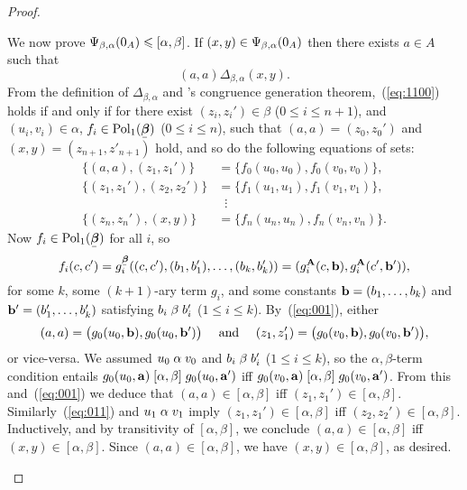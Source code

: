 \begin{proof}
\begin{enumerate}[(i)]
  We now prove $\Psi_{\beta, \alpha}(0_A)\leqslant   [\alpha, \beta]$.
  If $(x,y)\in \Psi_{\beta, \alpha}(0_A)$ then there exists $a \in A$ such that 
  \begin{equation}
    \label{eq:1100}
    (a,a) \mathrel{\Delta_{\beta, \alpha}} (x,y).
  \end{equation}
  From the definition of $\Delta_{\beta, \alpha}$ and 
  \malcev's congruence generation theorem,~(\ref{eq:1100})
  holds if and only if for there exist
  $(z_i, z_i') \in \beta$ ($0\leq i \leq n+1$), and $(u_i, v_i) \in \alpha$,
  $f_i \in \Pol_1(\bbeta)$ ($0\leq i \leq n$), such that
  $(a, a) = (z_0,z_0')$ and $(x, y)=(z_{n+1},z'_{n+1})$ hold, and so do the
  following equations of sets: 
  \begin{align}
    \label{eq:001}
    \{(a, a),(z_1,z_1')\} &= \{f_0(u_0,u_0), f_0(v_0,v_0)\},\\
    \label{eq:011}
    \{(z_1,z_1'),(z_2,z_2')\} &= \{f_1(u_1,u_1), f_1(v_1,v_1)\},\\
    \nonumber
    &\; \; \vdots\\
    \nonumber
    \{(z_{n},z_{n}'),(x, y)\} &= \{f_{n}(u_{n},u_{n}), f_{n}(v_{n},v_{n})\}.
  \end{align}
  Now $f_i \in \Pol_1(\bbeta)$ for all $i$, so
  \newcommand\gA{\ensuremath{g^{\bA}}}%
  \[
  f_i(c, c') = g_i^{\bbeta}((c, c'), (b_1, b_1'), \dots, (b_k, b_k') )
  = (\gA_i(c, \bb), \gA_i(c', \bb')),%
  \]
  \renewcommand\gA{\ensuremath{g}}%
  for some $k$, some $(k+1)$-ary term $\gA_i$, and some constants
  $\mathbf{b} = (b_1, \dots, b_k)$ and $\mathbf{b}' = (b_1', \dots, b_k')$ satisfying
  $b_i \mathrel{\beta} b_i'$ ($1\leq i\leq k$). 
  By~(\ref{eq:001}), either
  \[
  (a, a) = \bigl(\gA_0(u_0, \bb), \gA_0(u_0, \bb')\bigr)
  \quad \text{ and } \quad 
  (z_1,z_1')= \bigl(\gA_0(v_0, \bb), \gA_0(v_0, \bb')\bigr),
  \]
  or vice-versa. %
  We assumed $u_0 \mathrel{\alpha} v_0$ and $b_i \mathrel{\beta} b_i'$ ($1\leq i\leq k$),
  so the $\alpha,\beta$-term condition entails
  $\gA_0(u_0, \ba) \commr{\alpha}{\beta} \gA_0(u_0, \ba')$
  iff 
  $\gA_0(v_0, \ba) \commr{\alpha}{\beta} \gA_0(v_0, \ba')$.
  From this and~(\ref{eq:001}) we deduce that 
  $(a,a)\in [\alpha, \beta]$ iff $(z_1,z_1')\in [\alpha, \beta]$.
  Similarly~(\ref{eq:011}) and $u_1 \mathrel{\alpha} v_1$ imply
  $(z_1,z_1')\in [\alpha, \beta]$ iff
  $(z_2,z_2')\in [\alpha, \beta]$.  Inductively, and by transitivity of
  $[\alpha, \beta]$, we conclude $(a,a)\in [\alpha, \beta]$ iff
  $(x,y)\in [\alpha, \beta]$.
  Since $(a,a)\in [\alpha, \beta]$, we have $(x,y)\in [\alpha, \beta]$, as desired.

  \end{enumerate}
\end{proof}

